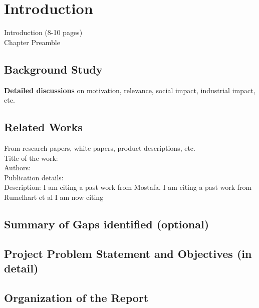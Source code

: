 \chapter{Introduction}
\graphicspath{{Introduction/IntroductionFigs/EPS/}{Introduction/IntroductionFigs/}}

Introduction (8-10 pages)\\
Chapter Preamble
\section{Background Study}
\textbf{Detailed discussions} on motivation, relevance, social impact, industrial impact, etc.
	
\section{Related Works}
From research papers, white papers, product descriptions, etc.\\
Title of the work:\\
Authors:\\
Publication details:\\
Description:
I am citing a past work from Mostafa\cite{Mostafa:VC}.
I am citing a past work from Rumelhart et al\cite{Rumelhart-Hinton-Williams:MLP}
I am now citing \cite{Moody-Darken:RBF}

\section{Summary of Gaps identified (optional)}
\section{Project Problem Statement and Objectives (in detail)}
\section{Organization of the Report}  


